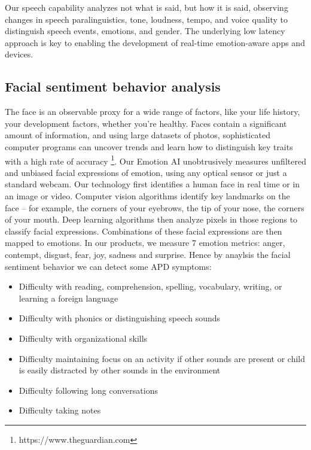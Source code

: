 \documentclass[letterpaper%
, twoside%
, 12pt%
,these%
, english%
,creativecommons,hyperref%
]{thETS}
\begin{document}
Our speech capability analyzes not what is said, but how it is said, observing changes in speech
paralinguistics, tone, loudness, tempo, and voice quality to distinguish speech events, emotions,
and gender. The underlying low latency approach is key to enabling the development of
real-time emotion-aware apps and devices.







\subsection{Facial sentiment behavior analysis}
The face is an observable proxy for a wide range of factors, like your life history, your development
factors, whether you’re healthy. Faces contain a significant amount of information,
and using large datasets of photos, sophisticated computer programs can uncover trends and
learn how to distinguish key traits with a high rate of accuracy \footnote{https://www.theguardian.com}. Our Emotion AI unobtrusively
measures unfiltered and unbiased facial expressions of emotion, using any optical sensor
or just a standard webcam. Our technology first identifies a human face in real time or in an
image or video. Computer vision algorithms identify key landmarks on the face – for example,
the corners of your eyebrows, the tip of your nose, the corners of your mouth. Deep learning
algorithms then analyze pixels in those regions to classify facial expressions. Combinations of
these facial expressions are then mapped to emotions. In our products, we measure 7 emotion
metrics: anger, contempt, disgust, fear, joy, sadness and surprise. Hence by anaylsis the facial
sentiment behavior we can detect some APD symptoms:
\begin{itemize}
	\item  Difficulty with reading, comprehension, spelling, vocabulary, writing, or learning a foreign
	language
		\item  Difficulty with phonics or distinguishing speech sounds
		\item  Difficulty with organizational skills
		\item  Difficulty maintaining focus on an activity if other sounds are present or child is easily
	distracted by other sounds in the environment
		\item  Difficulty following long conversations
		\item  Difficulty taking notes
	
\end{itemize}
\end{document}
